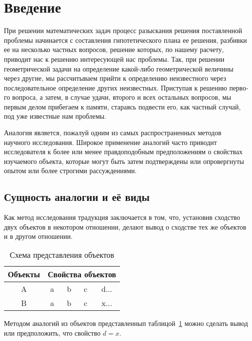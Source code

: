 \section{Введение}

При решении математических задач процесс разыскания решения поставленной
проблемы начинается с составления гипотетического плана ее решения, разбивки ее
на несколько частных вопросов, решение которых, по нашему расчету, приводит нас
к решению интересующей нас проблемы. Так, при решении геометрической задачи на
определение какой-либо геометрической величины через другие, мы рассчитываем
прийти к определению неизвестного через последовательное определение других
неизвестных. Приступая к решению перво­ го вопроса, а затем, в случае удачи,
второго и всех остальных вопросов, мы первым делом прибегаем к памяти, стараясь
подвести его, как частный случай, под уже известные нам проблемы.

Аналогия является, пожалуй одним из самых распространенных методов научного
исследования. Широкое применение аналогий часто приводит исследователя к более
или менее правдоподобным предположениям о свойствах изучаемого объекта, которые
могут быть затем подтверждены или опровергнуты опытом или более строгими
рассуждениями.

\subsection{Сущность аналогии и её виды}
Как метод исследования традукция заключается в том, что, установив сходство
двух объектов в некотором отношении, делают вывод о сходстве тех же объектов и
в другом отношении.

\begin{table}[H]
  \centering
  \begin{tabular}{c|cccc}
    Объекты & \multicolumn{4}{c}{Свойства объектов} \\
    \hline
    A & a & b & c & d$\dots$ \\
    B & a & b & c & x$\dots$ \\
  \end{tabular}
  \caption{Схема представления объектов}\label{tab:obj}
\end{table}

Методом аналогий из объектов представленнып таблицой~\ref{tab:obj} можно
сделать вывод или предположить, что свойство $d = x$.

